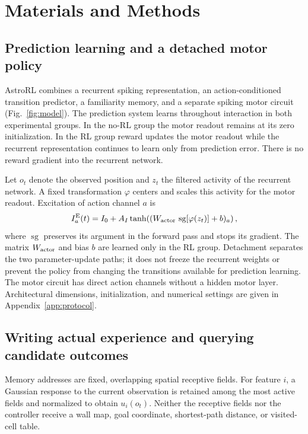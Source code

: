 \section{Materials and Methods}
\subsection{Prediction learning and a detached motor policy}
AstroRL combines a recurrent spiking representation, an action-conditioned transition predictor, a familiarity memory, and a separate spiking motor circuit (Fig.~\ref{fig:model}). The prediction system learns throughout interaction in both experimental groups. In the no-RL group the motor readout remains at its zero initialization. In the RL group reward updates the motor readout while the recurrent representation continues to learn only from prediction error. There is no reward gradient into the recurrent network.

Let $o_t$ denote the observed position and $z_t$ the filtered activity of the recurrent network. A fixed transformation $\varphi$ centers and scales this activity for the motor readout. Excitation of action channel $a$ is
\begin{equation}
 I^{\mathrm E}_a(t)=I_0+A_I\tanh\!\left((W_{\rm actor}\,\operatorname{sg}[\varphi(z_t)]+b)_a\right),
 \label{eq:actor}
\end{equation}
where $\operatorname{sg}$ preserves its argument in the forward pass and stops its gradient. The matrix $W_{\rm actor}$ and bias $b$ are learned only in the RL group. Detachment separates the two parameter-update paths; it does not freeze the recurrent weights or prevent the policy from changing the transitions available for prediction learning. The motor circuit has direct action channels without a hidden motor layer. Architectural dimensions, initialization, and numerical settings are given in Appendix~\ref{app:protocol}.



\subsection{Writing actual experience and querying candidate outcomes}
Memory addresses are fixed, overlapping spatial receptive fields. For feature $i$, a Gaussian response to the current observation is retained among the most active fields and normalized to obtain $u_i(o_t)$. Neither the receptive fields nor the controller receive a wall map, goal coordinate, shortest-path distance, or visited-cell table.

